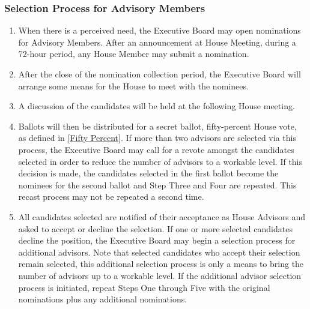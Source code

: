 \documentclass{article}
\newcommand{\bsubsection}[1]{\subsubsection{#1} \label{#1}}
\begin{document}
\bsubsection{Selection Process for Advisory Members}
\begin{enumerate}
	\item When there is a perceived need, the Executive Board may open nominations for Advisory Members. After an announcement at House Meeting, during a 72-hour period, any House Member may submit a nomination.
	\item After the close of the nomination collection period, the Executive Board will arrange some means for the House to meet with the nominees.
	\item A discussion of the candidates will be held at the following House meeting.
	\item Ballots will then be distributed for a secret ballot, fifty-percent House vote, as defined in \ref{Fifty Percent}. If more than two advisors are selected via this process, the Executive Board may call for a revote amongst the candidates selected in order to reduce the number of advisors to a workable level. If this decision is made, the candidates selected in the first ballot become the nominees for the second ballot and Step Three and Four are repeated. This recast process may not be repeated a second time.
	\item All candidates selected are notified of their acceptance as House Advisors and asked to accept or decline the selection. If one or more selected candidates decline the position, the Executive Board may begin a selection process for additional advisors. Note that selected candidates who accept their selection remain selected, this additional selection process is only a means to bring the number of advisors up to a workable level. If the additional advisor selection process is initiated, repeat Steps One through Five with the original nominations plus any additional nominations.
\end{enumerate}
\end{document}
